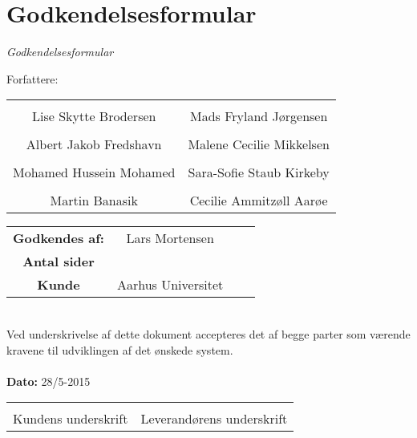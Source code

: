 \chapter{Godkendelsesformular}

{\LARGE\textit{Godkendelsesformular}}

{\large Forfattere:}
\\[5ex]


\begin{tabular}{c c}
\centering 
	\makebox[2.0in]{\hrulefill} & \makebox[2.0in]{\hrulefill}\\
	Lise Skytte Brodersen & Mads Fryland Jørgensen\\[7ex]
	\makebox[2.0in]{\hrulefill} & \makebox[2.0in]{\hrulefill}\\
	Albert Jakob Fredshavn & Malene Cecilie Mikkelsen\\[7ex]
	\makebox[2.0in]{\hrulefill} & \makebox[2.0in]{\hrulefill}\\
	Mohamed Hussein Mohamed & Sara-Sofie Staub Kirkeby\\[7ex]
	\makebox[2.0in]{\hrulefill} & \makebox[2.0in]{\hrulefill}\\
	Martin Banasik & Cecilie Ammitzøll Aarøe\\[7ex]

\end{tabular}

\begin{tabular}{c c c c}
	\textbf{Godkendes af:} & Lars Mortensen\\[3ex]
	\textbf{Antal sider} & \pageref{LastPage} \\[3ex]
	\textbf{Kunde} & Aarhus Universitet
\end{tabular}\\[8ex]
Ved underskrivelse af dette dokument accepteres det af begge parter som værende kravene til udviklingen af det ønskede system.
\\
\\
\textbf{Dato: } 28/5-2015\\[7ex]

\begin{tabular}{c c}
	\makebox[2.0in]{\hrulefill} & \makebox[2.0in]{\hrulefill}\\
	\centering 
	Kundens underskrift & Leverandørens underskrift
\end{tabular}
